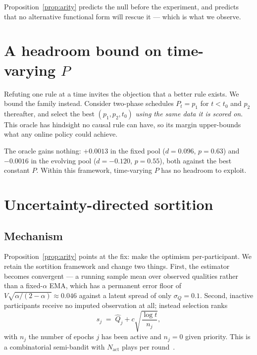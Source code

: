 \documentclass[10pt,twocolumn]{article}
\begin{document}
Proposition~\ref{prop:arity} predicts the null before the experiment, and predicts that
no alternative functional form will rescue it --- which is what we observe.

\section{A headroom bound on time-varying $P$}
\label{sec:headroom}

Refuting one rule at a time invites the objection that a better rule exists. We bound
the family instead. Consider two-phase schedules $P_t=p_1$ for $t<t_0$ and $p_2$
thereafter, and select the best $(p_1,p_2,t_0)$ \emph{using the same data it is scored
on}. This oracle has hindsight no causal rule can have, so its margin upper-bounds what
any online policy could achieve.

The oracle gains nothing: $+0.0013$ in the fixed pool ($d=0.096$, $p=0.63$) and
$-0.0016$ in the evolving pool ($d=-0.120$, $p=0.55$), both against the best constant
$P$. Within this framework, time-varying $P$ has no headroom to exploit.

\section{Uncertainty-directed sortition}
\label{sec:ucb}

\subsection{Mechanism}
Proposition~\ref{prop:arity} points at the fix: make the optimism per-participant.
We retain the sortition framework and change two things. First, the estimator becomes
convergent --- a running sample mean over observed qualities rather than a
fixed-$\alpha$ EMA, which has a permanent error floor of
$V\sqrt{\alpha/(2-\alpha)}\approx0.046$ against a latent spread of only
$\sigma_Q=0.1$. Second, inactive participants receive no imputed observation at all;
instead selection ranks
\begin{equation}\label{eq:ucb}
s_j \;=\; \hat Q_j + c\sqrt{\frac{\log t}{n_j}},
\end{equation}
with $n_j$ the number of epochs $j$ has been active and $n_j=0$ given priority. This is
a combinatorial semi-bandit with $N_{\mathrm{act}}$ plays per round~\cite{chen2013}.
\end{document}
